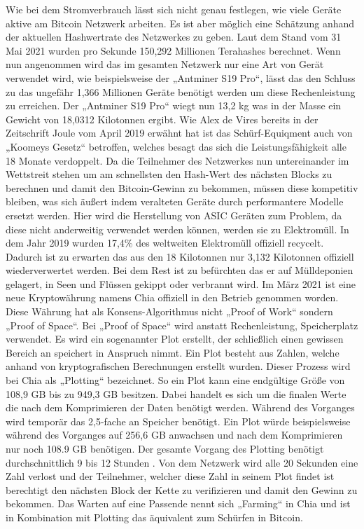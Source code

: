 \newline
Wie bei dem Stromverbrauch lässt sich nicht genau festlegen, wie viele Geräte aktive am Bitcoin Netzwerk arbeiten. Es ist aber möglich eine Schätzung anhand der aktuellen Hashwertrate \cite{blockchaincom_statistic_nodate} des Netzwerkes zu geben. Laut dem Stand vom 31 Mai 2021 wurden pro Sekunde 150,292 Millionen Terahashes berechnet. Wenn nun angenommen wird das im gesamten Netzwerk nur eine Art von Gerät verwendet wird, wie beispielsweise der „Antminer S19 Pro“, lässt das den Schluss zu das ungefähr 1,366 Millionen Geräte benötigt werden um diese Rechenleistung zu erreichen. Der „Antminer S19 Pro“ wiegt nun 13,2 kg was in der Masse ein Gewicht von 18,0312 Kilotonnen ergibt. Wie Alex de Vires \cite{de_vries_renewable_2019} bereits in der Zeitschrift Joule vom April 2019 erwähnt hat ist das Schürf-Equiqment auch von „Koomeys Gesetz“ betroffen, welches besagt das sich die Leistungsfähigkeit alle 18 Monate verdoppelt. Da die Teilnehmer des Netzwerkes nun untereinander im Wettstreit stehen um am schnellsten den Hash-Wert des nächsten Blocks zu berechnen und damit den Bitcoin-Gewinn zu bekommen, müssen diese kompetitiv bleiben, was sich äußert indem veralteten Geräte durch performantere Modelle ersetzt werden. Hier wird die Herstellung von ASIC Geräten zum Problem, da diese nicht anderweitig verwendet werden können, werden sie zu Elektromüll. In dem Jahr 2019 wurden 17,4\% \cite{forti_global_nodate} des weltweiten Elektromüll offiziell recycelt. Dadurch ist zu erwarten das aus den 18 Kilotonnen nur 3,132 Kilotonnen offiziell wiederverwertet werden. Bei dem Rest ist zu befürchten das er auf Mülldeponien gelagert, in Seen und Flüssen gekippt oder verbrannt wird.
\newline
Im März 2021 ist eine neue Kryptowährung namens Chia offiziell in den Betrieb genommen worden. Diese Währung hat als Konsens-Algorithmus nicht „Proof of Work“ sondern „Proof of Space“. Bei „Proof of Space“ wird anstatt Rechenleistung, Speicherplatz verwendet. Es wird ein sogenannter Plot erstellt, der schließlich einen gewissen Bereich an speichert in Anspruch nimmt. Ein Plot besteht aus Zahlen, welche anhand von kryptografischen Berechnungen erstellt wurden. Dieser Prozess wird bei Chia als „Plotting“ bezeichnet. So ein Plot kann eine endgültige Größe von 108,9 GB bis zu 949,3 GB \cite{hoffman_plot_2021} besitzen. Dabei handelt es sich um die finalen Werte die nach dem Komprimieren der Daten benötigt werden. Während des Vorganges wird temporär das 2,5-fache an Speicher benötigt. Ein Plot würde beispielsweise während des Vorganges auf 256,6 GB anwachsen und nach dem Komprimieren nur noch 108.9 GB benötigen. Der gesamte Vorgang des Plotting benötigt durchschnittlich 9 bis 12 Stunden \cite{hoffman_chia_2021}. Von dem Netzwerk wird alle 20 Sekunden eine Zahl verlost und der Teilnehmer, welcher diese Zahl in seinem Plot findet ist berechtigt den nächsten Block der Kette zu verifizieren und damit den Gewinn zu bekommen. Das Warten auf eine Passende nennt sich „Farming“ in Chia und ist in Kombination mit Plotting das äquivalent zum Schürfen in Bitcoin.
